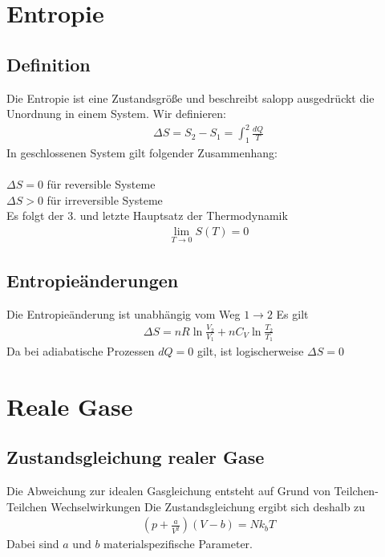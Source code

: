 \documentclass[a4paper,12pt]{report}
\begin{document}
\section{Entropie}

\subsection{Definition}
Die Entropie ist eine Zustandsgröße und beschreibt salopp ausgedrückt die Unordnung in einem System. Wir definieren:
\begin{align}
\Delta S = S_2 - S_1 = \int_{1}^{2} \frac{dQ}{T}
\end{align}
In geschlossenen System gilt folgender Zusammenhang: \\
\\
\hspace*{3cm}$\Delta S = 0$ für reversible Systeme \\
\hspace*{3cm}$\Delta S > 0$ für irreversible Systeme\\

Es folgt der 3. und letzte Hauptsatz der Thermodynamik
\begin{align}
\lim_{T \to 0} S(T) = 0
\end{align}
\subsection{Entropieänderungen}
Die Entropieänderung ist unabhängig vom Weg $1 \longrightarrow 2$
Es gilt 
\begin{align}
\Delta S = nR\ln{\frac{V_2}{V_1}} + nC_V\ln{\frac{T_2}{T_1}}
\end{align}
Da bei adiabatische Prozessen $dQ = 0$ gilt, ist logischerweise $\Delta S = 0$


\section{Reale Gase}

\subsection{Zustandsgleichung realer Gase}
Die Abweichung zur idealen Gasgleichung entsteht auf Grund von Teilchen-Teilchen Wechselwirkungen
Die Zustandsgleichung ergibt sich deshalb zu
\begin{align}
(p+\frac{a}{V^2})(V-b) = Nk_bT
\end{align}
Dabei sind $a$ und $b$ materialspezifische Parameter.
\end{document}
